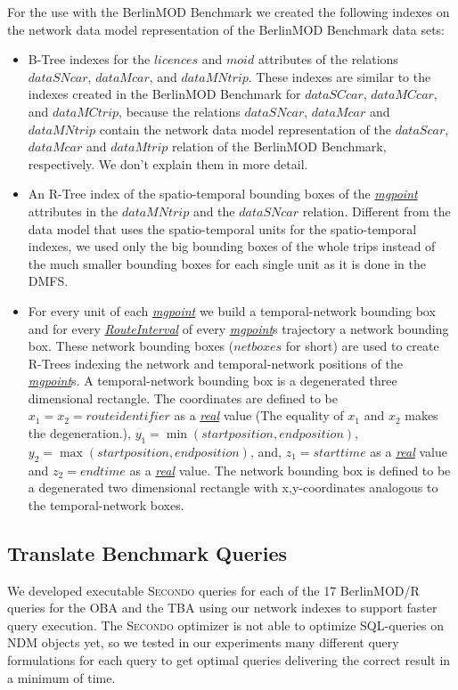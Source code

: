 \documentclass[a4paper]{article}
\newcommand{\secondo}{\textsc{Secondo}}
\newcommand{\bmodb} {BerlinMOD Benchmark}
\newcommand{\dt}[1]{\textsl{\underline{#1}}}
\begin{document}
For the use with the \bmodb{} we created the following indexes on the network
data model representation of the \bmodb{} data sets:
\begin{itemize}
  \item B-Tree indexes for the $licences$ and $moid$ attributes of the relations
$dataSNcar$, $dataMcar$, and $dataMNtrip$. These indexes are similar to the indexes
created in the \bmodb{} for $dataSCcar$, $dataMCcar$, and $dataMCtrip$, because
the relations $dataSNcar$, $dataMcar$ and $dataMNtrip$ contain the network
data model representation of the $dataScar$, $dataMcar$ and $dataMtrip$ relation
of the \bmodb{}, respectively. We don't explain them in more detail.
  \item An R-Tree index of the spatio-temporal bounding boxes of the \dt{mgpoint}
attributes in the $dataMNtrip$ and the $dataSNcar$ relation. Different from the
data model that uses the spatio-temporal units for the spatio-temporal indexes, we
used only the big bounding boxes of the whole trips instead of the much smaller
bounding boxes for each single unit as it is done in the DMFS.
 \item For every unit of each \dt{mgpoint} we build a temporal-network bounding box
and for every \dt{RouteInterval} of every \dt{mgpoint}s trajectory a network bounding box.
These network bounding boxes ($netboxes$ for short) are used to create R-Trees
indexing the network and temporal-network positions of the \dt{mgpoint}s.
A temporal-network bounding box
is a degenerated three dimensional rectangle. The coordinates are defined to be
$x_1 = x_2 = route identifier$ as a \dt{real} value (The equality of $x_1$ and
$x_2$ makes the degeneration.), $y_1 = \min (start position, end position)$,
$y_2 = \max (start position, end position)$,
and, $z_1 = start time$ as a \dt{real} value and $z_2 = end time$ as a \dt{real} value.
The network bounding box is defined to be a degenerated two dimensional rectangle
with x,y-coordinates analogous to the temporal-network boxes.
\end{itemize}
\subsection{Translate Benchmark Queries}
\label{sec:queries}
We developed executable \secondo{} queries for each of the 17 BerlinMOD/R queries
for the OBA and the TBA using our network indexes to support faster query execution.
The \secondo{} optimizer is not able to optimize SQL-queries on NDM objects yet, so we tested in
our experiments many different query formulations for each query to get optimal
queries delivering the correct result in a minimum of time.
\end{document}

